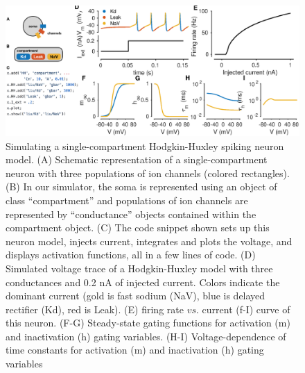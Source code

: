\documentclass{frontiersSCNS} %
\begin{document}
\FloatBarrier

\newpage



\begin{figure}
	\centering
	\includegraphics[width=1.0\linewidth]{gfx/figure_HH}
	\caption{Simulating a single-compartment Hodgkin-Huxley spiking neuron model. (A) Schematic representation of a single-compartment neuron with three populations of ion channels (colored rectangles). (B) In our simulator, the soma is represented using an object of class ``compartment'' and populations of ion channels are represented by ``conductance'' objects contained within the compartment object. (C) The code snippet shown sets up this neuron model, injects current, integrates and plots the voltage, and displays activation functions, all in a few lines of code. (D) Simulated voltage trace of a Hodgkin-Huxley model with three conductances and 0.2 nA of injected current. Colors indicate the dominant current (gold is fast sodium (NaV), blue is delayed rectifier (Kd), red is Leak). (E) firing rate $vs$. current (f-I) curve of this neuron. (F-G) Steady-state gating functions for activation (m) and inactivation (h) gating variables. (H-I) Voltage-dependence of time constants for activation (m) and inactivation (h) gating variables}
	\label{fig:figurehh}
\end{figure}
\end{document}
